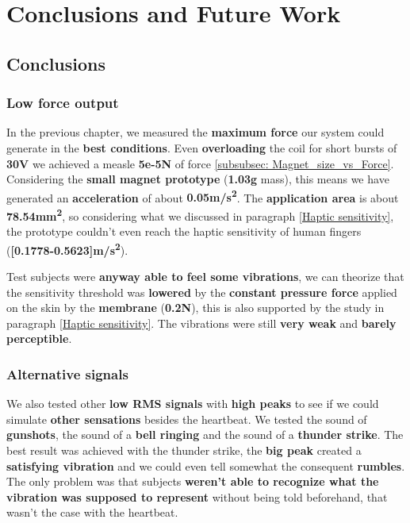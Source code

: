 
\chapter{Conclusions and Future Work}
\label{Chapter6}

\section{Conclusions}

\subsection{Low force output}
In the previous chapter, we measured the \textbf{maximum force} our system could generate in the \textbf{best conditions}.
Even \textbf{overloading} the coil for short bursts of \textbf{30V} we achieved a measle \textbf{5e-5N} of force \ref{subsubsec: Magnet_size_vs_Force}.
Considering the \textbf{small magnet prototype} (\textbf{1.03g} mass), this means we have generated an \textbf{acceleration} of about \textbf{0.05m/s\textsuperscript{2}}.
The \textbf{application area} is about \textbf{78.54mm\textsuperscript{2}}, so considering what we discussed in paragraph \ref{Haptic sensitivity}, the prototype couldn't even reach the haptic sensitivity of human fingers (\textbf{[0.1778-0.5623]m/s\textsuperscript{2}}).

Test subjects were \textbf{anyway able to feel some vibrations}, we can theorize that the sensitivity threshold was \textbf{lowered} by the \textbf{constant pressure force} applied on the skin by the \textbf{membrane} (\textbf{0.2N}), this is also supported by the study in paragraph \ref{Haptic sensitivity}.
The vibrations were still \textbf{very weak} and \textbf{barely perceptible}.

\subsection{Alternative signals}
We also tested other \textbf{low RMS signals} with \textbf{high peaks} to see if we could simulate \textbf{other sensations} besides the heartbeat.
We tested the sound of \textbf{gunshots}, the sound of a \textbf{bell ringing} and the sound of a \textbf{thunder strike}.
The best result was achieved with the thunder strike, the \textbf{big peak} created a \textbf{satisfying vibration} and we could even tell somewhat the consequent \textbf{rumbles}.
The only problem was that subjects\textbf{ weren't able to recognize what the vibration was supposed to represent} without being told beforehand, that wasn't the case with the heartbeat.

